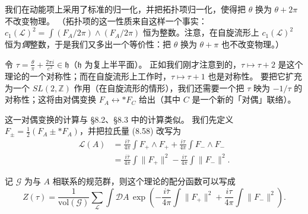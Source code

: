 我们在动能项上采用了标准的归一化，并把拓扑项归一化，使得把 $\theta$ 换为 $\theta+2\pi$ 不改变物理。
（拓扑项的这一性质来自这样一个事实：$c_{1}(\mathcal{L})^{2}=\int(F_{A}/2\pi)\wedge(F_{A}/2\pi)$ 恒为整数。注意，在自旋流形上 $c_{1}(\mathcal{L})^{2}$ 恒为\emph{偶}整数，于是我们又多出一个等价性：把 $\theta$ 换为 $\theta+\pi$ 也不改变物理。）

令 $\tau=\frac{\theta}{\pi}+\frac{2\pi i}{e^{2}}\in\mathfrak{h}$（$\mathfrak{h}$ 为复上半平面）。
正如我们刚才注意到的，$\tau\mapsto\tau+2$ 是这个理论的一个对称性；而在自旋流形上工作时，$\tau\mapsto\tau+1$ 也是对称性。
要把它扩充为一个 $SL(2,\mathbb{Z})$ 作用（在自旋流形的情形），我们还需要一个把 $\tau$ 映为 $-1/\tau$ 的对称性；这将由对偶变换 $F_{A}\leftrightarrow *F_{C}$ 给出（其中 $C$ 是一个新的「对偶」联络）。

这一对偶变换的计算与 §8.2、§8.3 中的计算类似。
我们先定义 $F_{\pm}=\frac12(F_{A}\pm *F_{A})$，并把拉氏量 (8.58) 改写为
\begin{equation}
  \tag{8.59}
  \label{eq:8-59}
  \begin{aligned}
  \mathcal{L}(A)&=\frac{i\bar\tau}{4\pi}\int F_{+}\wedge F_{+}+\frac{i\tau}{4\pi}\int F_{-}\wedge F_{-}\\
  &=\frac{i\bar\tau}{4\pi}\int\|F_{+}\|^{2}-\frac{i\tau}{4\pi}\int\|F_{-}\|^{2}.
  \end{aligned}
\end{equation}


记 $\mathcal{G}$ 为与 $A$ 相联系的规范群，则这个理论的配分函数可以写成
\begin{equation}
  \tag{8.60}
  \label{eq:8-60}
  Z(\tau)=\frac{1}{\mathrm{vol}(\mathcal{G})}\sum_{\mathcal{L}}\int\mathcal{D}A\,\exp\left(-\frac{i\bar\tau}{4\pi}\int\|F_{+}\|^{2}+\frac{i\tau}{4\pi}\int\|F_{-}\|^{2}\right).
\end{equation}

